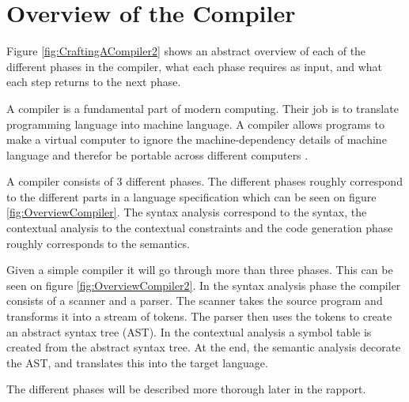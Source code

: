 \section{Overview of the Compiler}


Figure \ref{fig:CraftingACompiler2} shows an abstract overview of each of the different phases in the compiler, what each phase requires as input, and what each step returns to the next phase.

A compiler is a fundamental part of modern computing. Their job is to translate programming language into machine language. A compiler allows programs to make a virtual computer to ignore the machine-dependency details of machine language and therefor be portable across different computers  \citep{CraftingACompiler}.



A compiler consists of 3 different phases. The different phases roughly correspond to the different parts in a language specification which can be seen on figure \ref{fig:OverviewCompiler}. The syntax analysis correspond to the syntax, the contextual analysis to the contextual constraints and the code generation phase roughly corresponds to the semantics.

Given a simple compiler it will go through more than three phases. This can be seen on figure \ref{fig:OverviewCompiler2}. In the syntax analysis phase the compiler consists of a scanner and a parser. The scanner takes the source program and transforms it into a stream of tokens. The parser then uses the tokens to create an abstract syntax tree (AST). In the contextual analysis a symbol table is created from the abstract syntax tree. At the end, the semantic analysis decorate the AST, and translates this into the target language.

The different phases will be described more thorough later in the rapport. 